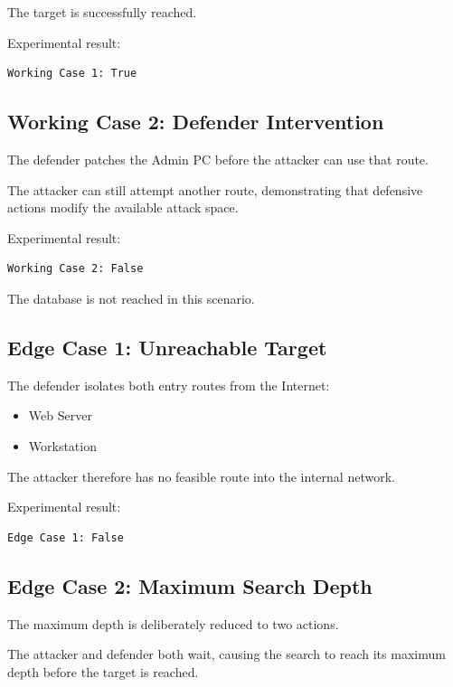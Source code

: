 \documentclass[12pt,a4paper]{article}
\begin{document}
The target is successfully reached.

Experimental result:

\begin{verbatim}
Working Case 1: True
\end{verbatim}

\subsection{Working Case 2: Defender Intervention}

The defender patches the Admin PC before the attacker can use that route.

The attacker can still attempt another route, demonstrating that defensive
actions modify the available attack space.

Experimental result:

\begin{verbatim}
Working Case 2: False
\end{verbatim}

The database is not reached in this scenario.

\subsection{Edge Case 1: Unreachable Target}

The defender isolates both entry routes from the Internet:

\begin{itemize}
    \item Web Server
    \item Workstation
\end{itemize}

The attacker therefore has no feasible route into the internal network.

Experimental result:

\begin{verbatim}
Edge Case 1: False
\end{verbatim}

\subsection{Edge Case 2: Maximum Search Depth}

The maximum depth is deliberately reduced to two actions.

The attacker and defender both wait, causing the search to reach its maximum
depth before the target is reached.
\end{document}
